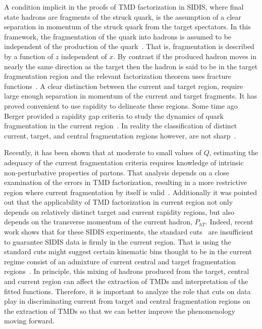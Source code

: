 \documentclass[final,3p,times,onecolumn,sort&compress,hidelinks]{elsarticle}
\newcommand\3[1]{\boldsymbol{#1}}
\newcommand{\cbl}{\color{blue}}
\begin{document}
 A condition implicit in the proofs of TMD factorization in SIDIS,
 where final state hadrons are   fragments of the
 struck quark, is the assumption of  a clear separation in momentum of the struck quark from the target spectators. In this framework,  the fragmentation of the quark into hadrons is assumed to be independent of the production of the quark~\cite{Berger:1987zu,Trentadue:1993ka}. That is, 
 fragmentation is described by a function of $z$ independent of $x$.  By contrast if the produced hadron moves in nearly the same direction as the target then the hadron is said to be in the target fragmentation region and the relevant factorization theorem uses fracture functions~\cite{Trentadue:1993ka,Grazzini:1997ih,Anselmino:2011ss}.   A clear distinction between the current and target  region, require large enough separation in momentum of the current and target fragments.  It has proved  convenient to use rapidity to delineate these regions.   Some time ago Berger provided a rapidity gap criteria  to study the dynamics of quark fragmentation in the current region~\cite{Berger:1987zu,Mulders:2000jt}.  In reality the classification of distinct current, target, and central fragmentation regions however, are not sharp~\cite{Berger:1987zu,Mulders:2000jt,Joosten:2013mia,Boglione:2016bph,Collins:2018teg}.

 Recently, it has been shown that at moderate to small values of $Q$, estimating the adequacy of the current fragmentation criteria requires knowledge of intrinsic non-perturbative properties of partons. That analysis depends on a close examination of the errors in TMD factorization, resulting in
 a more restrictive region where current fragmentation by itself is valid~\cite{Boglione:2016bph}.
 Additionally it was pointed out that the applicability of TMD factorization  %
 in  current region not only depends on 
 relatively distinct target and current rapidity regions, but also depends on the transverse momentum of the current hadron, $P_{hT}$.
 Indeed, recent work shows that for these SIDIS experiments, the standard cuts~\cite{Anselmino:2013lza,Bacchetta:2017gcc}
 are insufficient to guarantee %
  SIDIS data is firmly in the current region.
  That is using the  standard cuts
 might suggest 
 certain kinematic bins thought to be
 in the current regime consist of an admixture of
 current central and  target fragmentation regions~\cite{Boglione:2016bph}.  In principle, this mixing of hadrons produced from the target, central and current region can affect the extraction of TMDs and interpretation of the fitted functions.  {\cbl Therefore, it is important to analyze the role that   cuts on data play in
 discriminating  current  from target and central fragmentation regions on the
 extraction of TMDs so that we can better improve the phenomenology moving forward.}
\end{document}
